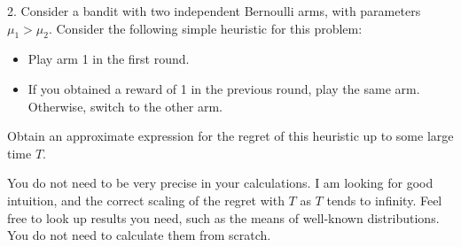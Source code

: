 \documentclass[11pt,a4paper]{article}
\begin{document}
\begin{question}{2.}
  Consider a bandit with two independent Bernoulli arms, with parameters $\mu_1>\mu_2$. Consider the following simple heuristic for this problem:
  \begin{itemize}
    \item Play arm 1 in the first round.
    \item If you obtained a reward of 1 in the previous round, play the same arm. Otherwise, switch to the other arm.
  \end{itemize}
  Obtain an approximate expression for the regret of this heuristic up to some large time $T$.
  \par You do not need to be very precise in your calculations. I am looking for good intuition, and the correct scaling of the regret with $T$ as $T$ tends to infinity. Feel free to look up results you need, such as the means of well-known distributions. You do not need to calculate them from scratch.
\end{question}
\end{document}
